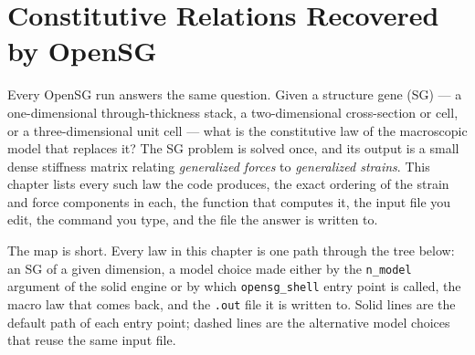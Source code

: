\chapter{Constitutive Relations Recovered by OpenSG}
\label{ch:constitutive}

Every OpenSG run answers the same question. Given a structure gene (SG) --- a
one-dimensional through-thickness stack, a two-dimensional cross-section or
cell, or a three-dimensional unit cell --- what is the constitutive law of the
macroscopic model that replaces it? The SG problem is solved once, and its
output is a small dense stiffness matrix relating \emph{generalized forces} to
\emph{generalized strains}. This chapter lists every such law the code
produces, the exact ordering of the strain and force components in each, the
function that computes it, the input file you edit, the command you type, and
the file the answer is written to.

The map is short. Every law in this chapter is one path through
the tree below: an SG of a given dimension, a model choice made either by the
\texttt{n\_model} argument of the solid engine or by which
\texttt{opensg\_shell} entry point is called, the macro law that comes back, and
the \texttt{.out} file it is written to. Solid lines are the default path of
each entry point; dashed lines are the alternative model choices that reuse the
same input file.

